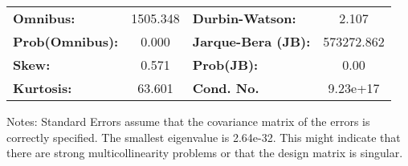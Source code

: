 \begin{center}
\begin{tabular}{lcccccc}
\bottomrule
\end{tabular}
\begin{tabular}{lclc}
\textbf{Omnibus:}       & 1505.348 & \textbf{  Durbin-Watson:     } &     2.107   \\
\textbf{Prob(Omnibus):} &   0.000  & \textbf{  Jarque-Bera (JB):  } & 573272.862  \\
\textbf{Skew:}          &   0.571  & \textbf{  Prob(JB):          } &      0.00   \\
\textbf{Kurtosis:}      &  63.601  & \textbf{  Cond. No.          } &  9.23e+17   \\
\bottomrule
\end{tabular}
\end{center}

Notes: \newline
 [1] Standard Errors assume that the covariance matrix of the errors is correctly specified. \newline
 [2] The smallest eigenvalue is 2.64e-32. This might indicate that there are \newline
 strong multicollinearity problems or that the design matrix is singular.